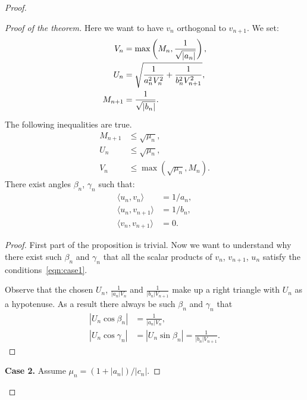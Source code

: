 \begin{proof}
\begin{proof}[Proof of the theorem]
          Here we want to have $v_n$ orthogonal to $v_{n+1}$.
          We set:
          \begin{align*}
              V_n &= \max\left(M_n, \frac{1}{\sqrt{\smash[b]{|a_n|}}}\right),\\
              U_n &= \sqrt{\frac{1}{a_n^2 V_n^2} + \frac{1}{b_n^2 V_{n+1}^2}},\\
              M_{n+1} &= \frac{1}{\sqrt{\smash[b]{|b_n|}}}.
          \end{align*}
          \begin{prop}
            The following inequalities are true.
            \begin{align*}
              M_{n+1} &\leq \sqrt{\mu_n},\\
              U_n &\leq \sqrt{\mu_n},\\
              V_n &\leq \max(\sqrt{\mu_n}, M_n).
            \end{align*}
            There exist angles $\beta_n$, $\gamma_n$ such that:
            \begin{equation}
              \label{eqn:case1}
              \begin{aligned}
                \langle u_n, v_n \rangle &= 1/a_n,\\
                \langle u_n, v_{n+1} \rangle &= 1/b_n,\\
                \langle v_n, v_{n+1} \rangle &= 0.
              \end{aligned}
            \end{equation}
          \end{prop}
          \begin{proof}
            First part of the proposition is trivial.
            Now we want to understand why there exist such $\beta_n$ and $\gamma_n$ that all the scalar products of
              $v_n$, $v_{n+1}$, $u_n$ satisfy the conditions~\eqref{eqn:case1}.

            Observe that the chosen $U_n$, $\frac{1}{|a_n| V_n}$ and $\frac{1}{|b_n| V_{n+1}}$
              make up a right triangle with $U_n$ as a hypotenuse.
            As a result there always be such $\beta_n$ and $\gamma_n$ that
            \begin{align*}
              |U_n \cos{\beta_n}| &= \frac{1}{|a_n|V_n},\\
              \left|U_n \cos{\gamma_n}\right| &= \left|U_n \sin{\beta_n}\right| = \frac{1}{|b_n|V_{n+1}}.
            \end{align*}
          \end{proof}
        \noindent\textbf{Case 2.} Assume $\mu_n = (1 + |a_n|)/|c_n|$.


\end{proof}
\end{proof}
